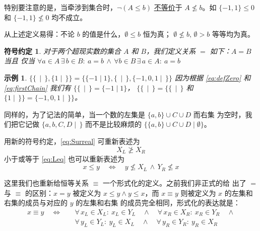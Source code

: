 \documentclass[cs4size,a4paper,adobefonts]{ctexart}
\newtheorem*{symbolDef}{符号约定}
\newtheorem*{forExample}{示例}
\newcommand{\pname}[1]{\underline{#1}}
\numberwithin{equation}{section}
\begin{document}
特别要注意的是，当牵涉到集合时，$\neg(A\leq b)$ \pname{不等价}于
$A\nleq b$。如 $\{-1,1\}\leq 0$ 和 $\{-1,1\}\nleq 0$ 均不成立。

从上述定义易得：不论 $b$ 的值是什么，$\emptyset \leq b$ 恒为真；
$\emptyset \nleq b,\,\emptyset > b$ 等等均为真。

\begin{symbolDef}
  对于两个超现实数的集合 $A$ 和 $B$，我们定义关系 $=$ 如下：$A=B$ 当且
  仅当 $\forall a \in A \, \exists\, b \in B:\:a=b \,\wedge\, \forall b
  \in B \, \exists\, a \in A:\: a=b$
\end{symbolDef}
\begin{forExample}
  $\{\{\,\mid\,\},\{1\mid\,\}\} = \{\{-1\mid
  1\},\{\,\mid\,\},\{-1,0,1\mid\,\}\}$ 因为根据 \eqref{eq:defZero} 和
  \eqref{eq:firstChain} 我们有 $\{\{\,\mid\,\}=\{-1\mid1\}$，
  $\{\{\,\mid\,\}=\{\{\,\mid\,\}$ 和
  $\{1\mid\,\}\}=\{-1,0,1\mid\,\}\}$。
\end{forExample}

同样的，为了记法的简单，当一个数的左集是 $\{a,b\}\cup C \cup D$ 而右集
为空时，我们把它记做 $\{a,b,C,D\mid\,\}$ 而不是比较麻烦的
$\{\{a,b\}\cup C \cup D\mid\emptyset\}$。

用新的符号约定，\eqref{eq:Surreal} 可重新表述为
\begin{equation}
  \label{eq:basic:Surreal}
  X_L \ngeq X_R
\end{equation}
小于或等于 \eqref{eq:Leq} 也可以重新表述为
\begin{equation}
  \label{eq:basic:Leq}
  x \leq y \quad\Leftrightarrow\quad 
  y \nleq X_L \,\wedge\, Y_R \nleq x
\end{equation}

这里我们也重新给恒等关系 $\equiv$ 一个形式化的定义。之前我们非正式的给
出了 $=$ 与 $\equiv$ 的区别：$x=y$ 被定义为 $x\leq y\wedge y\leq x$，而
$x\equiv y$ 则被定义为 $x$ 的左集和右集的成员与对应的 $y$ 的左集和右集
的成员完全相同，形式化的表达就是：
\begin{equation}
  \begin{split}
    x \equiv y \quad\Leftrightarrow\quad 
    &\forall\,x_L\in X_L:\:x_L\in Y_L \quad\wedge\quad
    \forall\,x_R\in X_R:\:x_R\in Y_R \quad\wedge\\
    &\forall\,y_L\in Y_L:\:y_L\in X_L \quad\wedge\quad
    \forall\,y_R\in Y_R:\:y_R\in X_R
  \end{split}
\end{equation}
\end{document}
